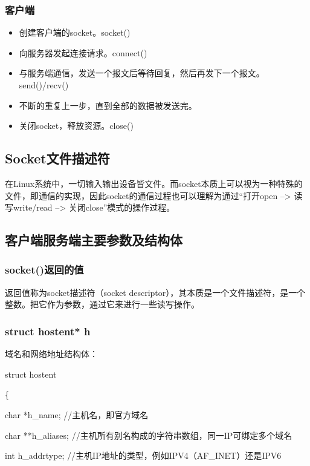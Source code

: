 \documentclass[UTF8]{article}%
\begin{document}
\subsubsection{客户端}

\begin{itemize}
    \item 创建客户端的socket。socket()
    \item 向服务器发起连接请求。connect()
    \item 与服务端通信，发送一个报文后等待回复，然后再发下一个报文。send()/recv()
    \item 不断的重复上一步，直到全部的数据被发送完。
    \item 关闭socket，释放资源。close()
\end{itemize}

\subsection{Socket文件描述符}

在Linux系统中，一切输入输出设备皆文件。而socket本质上可以视为一种特殊的文件，即通信的实现，因此socket的通信过程也可以理解为通过“打开open –> 读写write/read –> 关闭close”模式的操作过程。

\subsection{客户端服务端主要参数及结构体}

\subsubsection{socket()返回的值}

返回值称为socket描述符（socket descriptor），其本质是一个文件描述符，是一个整数。把它作为参数，通过它来进行一些读写操作。

\subsubsection{struct hostent* h}

域名和网络地址结构体：

struct hostent

\{

\qquad    char *h\_name;  //主机名，即官方域名
    
\qquad    char **h\_aliases;  //主机所有别名构成的字符串数组，同一IP可绑定多个域名

\qquad    int h\_addrtype; //主机IP地址的类型，例如IPV4（AF\_INET）还是IPV6
\end{document}
